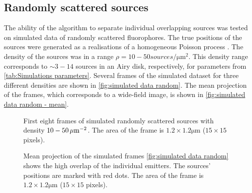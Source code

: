 
\subsection{Randomly scattered sources\label{sub:Simul random}}
The ability of the algorithm to separate individual overlapping sources was tested on simulated data of randomly scattered fluorophores. The true positions of the sources were generated as a realisations of a homogeneous Poisson process \cite{Ripley1977}. The density of the sources was in a range $\rho=10-50 \unit{sources/\um^2}$. This density range corresponds to $\sim 3-14$ sources in an Airy disk, respectively, for parameters from \autoref{tab:Simulations parameters}. Several frames of the simulated dataset for three different densities are shown in  \autoref{fig:simulated data random}. The mean projection of the frames, which corresponds to a wide-field image, is shown in \autoref{fig:simulated data random - mean}.
%
\begin{figure}[!htb]	
	\newcommand{\widthfig}{1\textwidth}
	\centering	
	
	
	\caption{First eight frames of simulated randomly scattered sources with density $10-50\, \mathrm{\mu m}^{-2}$. The area of the frame is $1.2\times1.2\unit{\um}$ ($15\times15$ pixels).}
	\label{fig:simulated data random}
\end{figure} 
%
\begin{figure}[!tb]	
	\newcommand{\widthfig}{.3\textwidth}
	\centering	
	\hspace{.3cm}	
	\hspace{.3cm}	
	\caption{Mean projection of the simulated frames \autoref{fig:simulated data random} shows the high overlap of the individual emitters. The sources' positions are marked with red dots. The area of the frame is $1.2\times1.2\unit{\um}$ ($15\times15$ pixels).}
	\label{fig:simulated data random - mean}
\end{figure} 

